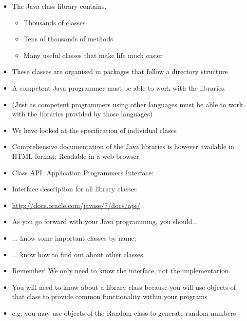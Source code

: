 \documentclass{beamer}
\begin{document}
\begin{frame} 
\begin{itemize}
\item The Java class library contains,
\begin{itemize}
\item Thousands of classes
\item Tens of thousands of methods
\item Many useful classes that make life much easier
\end{itemize}
\item These classes are organised in packages that follow a directory structure
\item A competent Java programmer must be able to work with the libraries.
\item (Just as competent programmers using other languages must be able to work with the libraries provided by those languages)
\end{itemize}
\end{frame} 

\begin{frame}
\begin{itemize}
\item We have looked at the specification of individual clases
\item Comprehensive documentation of the Java libraries is however available in HTML format; Readable in a web browser
\item Class API: Application Programmers Interface: 
\item Interface description for all library classes
\item \url{http://docs.oracle.com/javase/7/docs/api/}
\end{itemize}
\end{frame} 

\begin{frame}
\begin{itemize}
\item As you go forward with your Java programming, you should...
\bigskip
\item ... know some important classes by name; 
\item ... know how to find out about other classes.
\end{itemize}
\end{frame} 

\begin{frame}
\begin{itemize}
\item Remember! We only need to know the interface, not the implementation.
\bigskip
\item You will need to know about a library class because you will use objects of that class to provide common functionality within your programs
\item e.g. you may use objects of the Random class to generate random numbers
\end{itemize}
\end{frame} 
\end{document}
